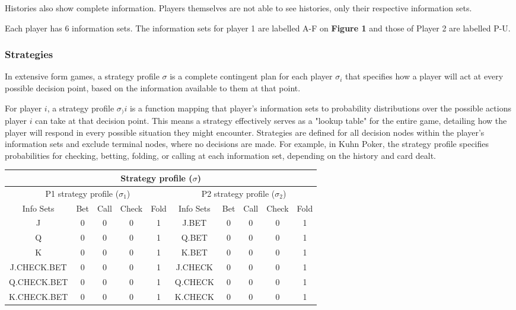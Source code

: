 \documentclass{article}
\begin{document}
Histories also show complete information. Players themselves are not able to see histories, only their respective information sets. 

Each player has 6 information sets. The information sets for player 1 are labelled A-F on \textbf{Figure 1} and those of Player 2 are labelled  P-U. 


\subsubsection{Strategies}
In extensive form games, a strategy profile $\sigma$ is a complete contingent plan for each player $\sigma_i$ that specifies how a player will act at every possible decision point, based on the information available to them at that point. 

For player \(i\), a strategy profile $\sigma_)i$ is a function mapping that player's information sets to probability distributions over the possible actions player $i$ can take at that decision point. This means a strategy effectively serves as a "lookup table" for the entire game, detailing how the player will respond in every possible situation they might encounter. Strategies are defined for all decision nodes within the player’s information sets and exclude terminal nodes, where no decisions are made. For example, in Kuhn Poker, the strategy profile  specifies probabilities for checking, betting, folding, or calling at each information set, depending on the history and card dealt.

\begin{center}
\begin{tabular}{||c | c c c c||c | c c c c||}
\hline\hline

 \multicolumn{10}{||c||}{Strategy profile ($\sigma$)} \\
 
\hline\hline
 \multicolumn{5}{||c||}{P1 strategy profile ($\sigma_1$)} & 
 \multicolumn{5}{||c||}{P2 strategy profile ($\sigma_2$)} \\

 \hline
 Info Sets & Bet & Call & Check  & Fold &
 Info Sets & Bet & Call & Check  & Fold
 \\ [0.5ex] 
 \hline\hline
 J & 0 & 0 & 0 & 1 & J.BET & 0 & 0 & 0 & 1\\ 
 \hline
 Q & 0 & 0 & 0 & 1 & Q.BET & 0 & 0 & 0 & 1\\
 \hline
 K & 0 & 0 & 0 & 1 & K.BET & 0 & 0 & 0 & 1\\
 \hline
 J.CHECK.BET & 0 & 0 & 0 & 1 & J.CHECK & 0 & 0 & 0 & 1\\
 \hline
 Q.CHECK.BET & 0 & 0 & 0 & 1 & Q.CHECK & 0 & 0 & 0 & 1\\ [1ex] 
 \hline
 K.CHECK.BET & 0 & 0 & 0 & 1 & K.CHECK & 0 & 0 & 0 & 1\\ [1ex] 
 \hline
\end{tabular}
\end{center}
\end{document}
